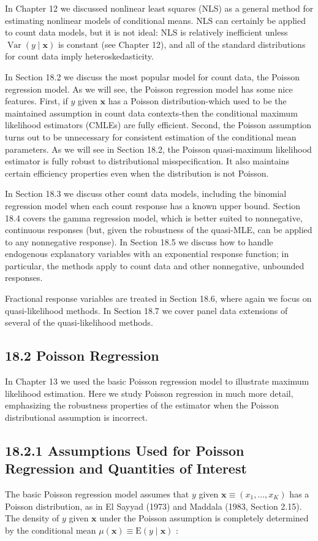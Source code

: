 \documentclass[10pt]{article}
\begin{document}
In Chapter 12 we discussed nonlinear least squares (NLS) as a general method for estimating nonlinear models of conditional means. NLS can certainly be applied to count data models, but it is not ideal: NLS is relatively inefficient unless $\operatorname{Var}(y \mid \mathbf{x})$ is constant (see Chapter 12), and all of the standard distributions for count data imply heteroskedasticity.

In Section 18.2 we discuss the most popular model for count data, the Poisson regression model. As we will see, the Poisson regression model has some nice features. First, if $y$ given $\mathbf{x}$ has a Poisson distribution-which used to be the maintained assumption in count data contexts-then the conditional maximum likelihood estimators (CMLEs) are fully efficient. Second, the Poisson assumption turns out to be unnecessary for consistent estimation of the conditional mean parameters. As we will see in Section 18.2, the Poisson quasi-maximum likelihood estimator is fully robust to distributional misspecification. It also maintains certain efficiency properties even when the distribution is not Poisson.

In Section 18.3 we discuss other count data models, including the binomial regression model when each count response has a known upper bound. Section 18.4 covers the gamma regression model, which is better suited to nonnegative, continuous responses (but, given the robustness of the quasi-MLE, can be applied to any nonnegative response). In Section 18.5 we discuss how to handle endogenous explanatory variables with an exponential response function; in particular, the methods apply to count data and other nonnegative, unbounded responses.

Fractional response variables are treated in Section 18.6, where again we focus on quasi-likelihood methods. In Section 18.7 we cover panel data extensions of several of the quasi-likelihood methods.

\subsection*{18.2 Poisson Regression}
In Chapter 13 we used the basic Poisson regression model to illustrate maximum likelihood estimation. Here we study Poisson regression in much more detail, emphasizing the robustness properties of the estimator when the Poisson distributional assumption is incorrect.

\subsection*{18.2.1 Assumptions Used for Poisson Regression and Quantities of Interest}
The basic Poisson regression model assumes that $y$ given $\mathbf{x} \equiv\left(x_{1}, \ldots, x_{K}\right)$ has a Poisson distribution, as in El Sayyad (1973) and Maddala (1983, Section 2.15). The density of $y$ given $\mathbf{x}$ under the Poisson assumption is completely determined by the conditional mean $\mu(\mathbf{x}) \equiv \mathrm{E}(y \mid \mathbf{x})$ :
\end{document}
